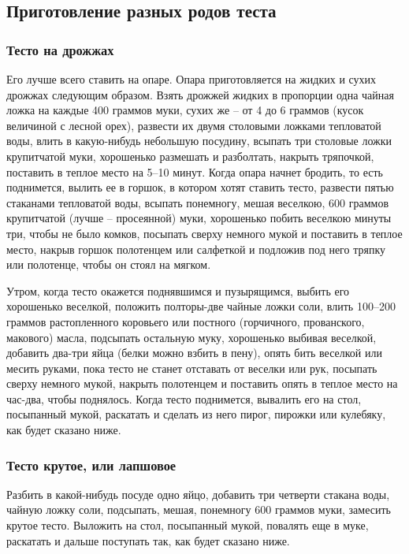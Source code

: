 \subsection*{Приготовление разных родов теста} \label{sec:obschie-testo}

\subsubsection{Тесто на дрожжах}\label{sub:drozhzhevoje}

Его лучше всего ставить на опаре. Опара приготовляется на жидких и сухих дрожжах следующим образом. Взять дрожжей жидких в пропорции одна чайная ложка на каждые 400 граммов муки, сухих же – от 4 до 6 граммов (кусок величиной с лесной орех), развести их двумя столовыми ложками тепловатой воды, влить в какую-нибудь небольшую посудину, всыпать три столовые ложки крупитчатой муки, хорошенько размешать и разболтать, накрыть тряпочкой, поставить в теплое место на 5–10 минут. Когда опара начнет бродить, то есть поднимется, вылить ее в горшок, в котором хотят ставить тесто, развести пятью стаканами тепловатой воды, всыпать понемногу, мешая веселкою, 600 граммов крупитчатой (лучше – просеянной) муки, хорошенько побить веселкою минуты три, чтобы не было комков, посыпать сверху немного мукой и поставить в теплое место, накрыв горшок полотенцем или салфеткой и подложив под него тряпку или полотенце, чтобы он стоял на мягком.

Утром, когда тесто окажется поднявшимся и пузырящимся, выбить его хорошенько веселкой, положить полторы-две чайные ложки соли, влить 100–200 граммов растопленного коровьего или постного (горчичного, прованского, макового) масла, подсыпать остальную муку, хорошенько выбивая веселкой, добавить два-три яйца (белки можно взбить в пену), опять бить веселкой или месить руками, пока тесто не станет отставать от веселки или рук, посыпать сверху немного мукой, накрыть полотенцем и поставить опять в теплое место на час-два, чтобы поднялось. Когда тесто поднимется, вывалить его на стол, посыпанный мукой, раскатать и сделать из него пирог, пирожки или кулебяку, как будет сказано ниже.

\subsubsection{Тесто крутое, или лапшовое}\label{sub:krutoje}

Разбить в какой-нибудь посуде одно яйцо, добавить три четверти стакана воды, чайную ложку соли, подсыпать, мешая, понемногу 600 граммов муки, замесить крутое тесто. Выложить на стол, посыпанный мукой, повалять еще в муке, раскатать и дальше поступать так, как будет сказано ниже.

